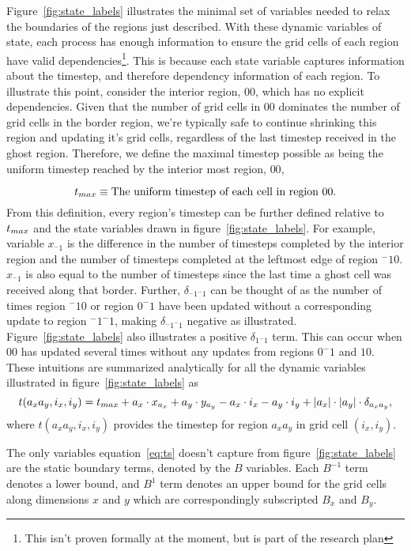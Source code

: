 Figure~\ref{fig:state_labels} illustrates the minimal set of
variables needed to relax the boundaries of the regions
just described.
With these dynamic variables of state, each process has enough information
to ensure the grid cells
of each region have valid dependencies\footnote{
  This isn't proven formally at the moment, but is part of the research plan
}.
This is because each state variable captures information about the timestep,
and therefore dependency information of each region.  To illustrate this point,
consider the interior region, $00$, which
has no explicit dependencies.  Given that the number of grid cells in $00$
dominates the number of grid cells in the border region, we're
typically safe to continue shrinking this region
and updating it's grid cells, regardless of the last timestep
received in the ghost region.
Therefore, we define the maximal timestep possible as being
the uniform timestep reached by the interior most
region, $00$,

\begin{equation}
  \text{$t_{max}$} \equiv \text{The uniform timestep of each cell in region $00$}.
\end{equation}
From this definition, every region's timestep can be further defined relative to $\text{$t_{max}$}$ and the state
variables drawn in figure~\ref{fig:state_labels}.  For example, variable $x_{^-1}$ is the difference in the
 number of timesteps completed by the interior region and the number of timesteps completed at the leftmost edge
 of region $^-10$.  $x_{^-1}$ is also equal to the number of timesteps since the last time a ghost cell was received along
 that border.  Further, $\delta_{^-1^-1}$ can be thought of as the number of times
region $^-10$ or region $0^-1$ have been updated without a corresponding update to region $^-1^-1$, making $\delta_{^-1^-1}$
negative as illustrated.  Figure~\ref{fig:state_labels} also illustrates a positive
 $\delta_{1^-1}$ term.  This can occur when $00$ has updated several times without
any updates from regions $0^-1$ and $10$.  These intuitions are
summarized analytically for all the dynamic variables illustrated
in figure~\ref{fig:state_labels} as
\begin{equation}
  t(a_xa_y,i_x,i_y) = \text{$t_{max}$} +
  a_x \cdot x_{a_x} + a_y \cdot y_{a_y} -
  a_x \cdot i_x - a_y \cdot i_y +
  |a_x|\cdot|a_y|\cdot\delta_{a_xa_y},
  \label{eq:ts}
\end{equation}
where $t(a_xa_y,i_x,i_y)$ provides the timestep for region $a_xa_y$ in grid cell $(i_x,i_y)$.

The only variables equation~\eqref{eq:ts} doesn't capture from figure~\ref{fig:state_labels} are the
static boundary terms, denoted by the $B$ variables.  Each $B^{-1}$ term denotes a lower bound, and $B^1$
 term
denotes an upper bound for the grid cells along dimensions $x$ and $y$ which are
correspondingly subscripted $B_x$ and $B_y$.

